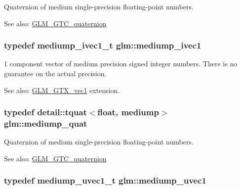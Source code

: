 Quaternion of medium single-precision floating-point numbers.

\begin{Desc}
\item[See also:]\hyperlink{group__gtc__quaternion}{GLM\_\-GTC\_\-quaternion} \end{Desc}
\hypertarget{namespaceglm_7efcceaaa791c2380d1b17bd7baa45ee}{
\subsubsection[mediump\_\-ivec1]{\setlength{\rightskip}{0pt plus 5cm}typedef mediump\_\-ivec1\_\-t {\bf glm::mediump\_\-ivec1}}}
\label{namespaceglm_7efcceaaa791c2380d1b17bd7baa45ee}


1 component vector of medium precision signed integer numbers. There is no guarantee on the actual precision. \begin{Desc}
\item[See also:]\hyperlink{group__gtx__vec1}{GLM\_\-GTX\_\-vec1} extension. \end{Desc}
\hypertarget{namespaceglm_a891775f83d9da605b5dd0dc34a3ef62}{
\subsubsection[mediump\_\-quat]{\setlength{\rightskip}{0pt plus 5cm}typedef detail::tquat$<$float, mediump$>$ {\bf glm::mediump\_\-quat}}}
\label{namespaceglm_a891775f83d9da605b5dd0dc34a3ef62}


Quaternion of medium single-precision floating-point numbers.

\begin{Desc}
\item[See also:]\hyperlink{group__gtc__quaternion}{GLM\_\-GTC\_\-quaternion} \end{Desc}
\hypertarget{namespaceglm_1fa5a5fb993ee72b4dc8d2a9caf85b26}{
\subsubsection[mediump\_\-uvec1]{\setlength{\rightskip}{0pt plus 5cm}typedef mediump\_\-uvec1\_\-t {\bf glm::mediump\_\-uvec1}}}
\label{namespaceglm_1fa5a5fb993ee72b4dc8d2a9caf85b26}


